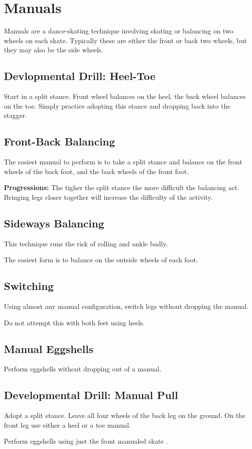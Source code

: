 \section{Manuals}
\label{sec:sticky/manuals}

Manuals are a dance-skating technique involving skating or balancing on two wheels on each skate.   
Typically these are either the front or back two wheels, but they may also be the side wheels.


\subsection*{Devlopmental Drill: Heel-Toe}

Start in a split stance. Front wheel balances on the heel, the back wheel balances on the toe. 
Simply practice adopting this stance and dropping back into the stagger.

\subsection*{Front-Back Balancing}

The easiest manual to perform is to take a split stance and balance on the front wheels of the back foot, and the back wheels of the front foot. 

{\bf Progressions:}
The tigher the split stance the more difficult the balancing act. Bringing legs closer together will increase the difficulty of the activity.  

\subsection*{Sideways Balancing}
This technique runs the risk of rolling and ankle badly.

The easiest form is to balance on the outside wheels of each foot.  

\subsection*{Switching}
Using almost any manual configuration, switch legs without dropping the manual.

Do not attempt this with both feet using heels.


\subsection*{Manual Eggshells}

Perform eggshells without dropping out of a manual.



\subsection*{Developmental Drill: Manual Pull}

Adopt a split stance. 
Leave all four wheels of the back leg on the ground.  
On the front leg use either a heel or a toe manual.  

Perform eggshells using just the front manualed skate . 

